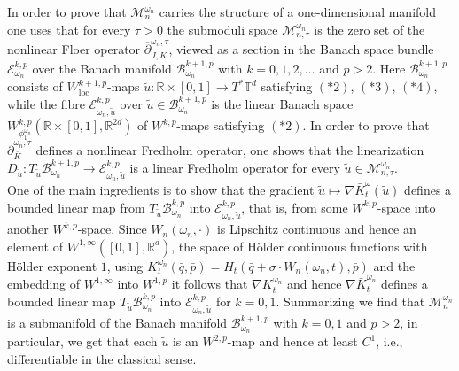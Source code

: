 \documentclass[a4paper,11pt]{amsart}
\newcommand{\RR}{\mathbb{R}}
\newcommand{\TT}{\mathbb{T}}
\begin{document}
\indent In order to prove that $\mathcal{M}^{\omega_n}_n$ carries the structure of a one-dimensional manifold one uses that for every $\tau>0$ the submoduli space $\mathcal{M}^{\omega_n}_{n,\tau}$ is the zero set of the nonlinear Floer operator $\overline{\partial}^{\omega_n,\tau}_{J,\bar{K}}$, viewed as a section in the Banach space bundle $\mathcal{E}^{k,p}_{\omega_n}$ over the Banach manifold $\mathcal{B}^{k+1,p}_{\omega_n}$ with $k=0,1,2,\ldots$ and $p>2$. Here $\mathcal{B}^{k+1,p}_{\omega_n}$ consists of $W^{k+1,p}_{\textrm{loc}}$-maps $\widetilde{u}:\RR\times [0,1]\to T^*\TT^d$ satisfying $(*2)$, $(*3)$, $(*4)$, while the fibre $\mathcal{E}^{k,p}_{\omega_n,\widetilde{u}}$ over $\widetilde{u}\in\mathcal{B}^{k+1,p}_{\omega_n}$ is the linear Banach space $W^{k,p}_{\phi^{\omega_n}_1}(\RR\times [0,1],\RR^{2d})$ of $W^{k,p}$-maps satisfying $(*2)$. In order to prove that $\overline{\partial}^{\omega_n,\tau}_{\bar{K}}$ defines a nonlinear Fredholm operator, one shows that the linearization $D_{\widetilde{u}}: T_{\widetilde{u}}\mathcal{B}^{k+1,p}_{\omega_n}\to \mathcal{E}^{k,p}_{\omega_n,\widetilde{u}}$ is a linear Fredholm operator for every $\widetilde{u}\in\mathcal{M}^{\omega_n}_{n,\tau}$. \\ \indent One of the main ingredients is to show that the gradient $\widetilde{u}\mapsto\nabla {\bar{K}}^{\omega}_t(\widetilde{u})$ defines a bounded linear map from $T_{\widetilde{u}}\mathcal{B}^{k,p}_{\omega_n}$ into $\mathcal{E}^{k,p}_{\omega_n,\widetilde{u}}$, that is, from some $W^{k,p}$-space into another $W^{k,p}$-space.  Since $W_n(\omega_n,\cdot)$ is Lipschitz continuous and hence an element of $W^{1,\infty}([0,1],\RR^d)$, the space of H\"older continuous functions with H\"older exponent $1$, using $K^{\omega_n}_t(\bar{q},\bar{p})=H_t(\bar{q}+\sigma\cdot W_n(\omega_n,t),\bar{p})$ and the embedding of $W^{1,\infty}$ into $W^{1,p}$ it follows that $\nabla K^{\omega_n}_t$ and hence $\nabla \bar{K}^{\omega_n}_t$ defines a bounded linear map $T_{\widetilde{u}}\mathcal{B}^{k,p}_{\omega_n}$ into $\mathcal{E}^{k,p}_{\omega_n,\widetilde{u}}$ for $k=0,1$. Summarizing we find that $\mathcal{M}^{\omega_n}_n$ is a submanifold of the Banach manifold $\mathcal{B}^{k+1,p}_{\omega_n}$ with $k=0,1$ and $p>2$, in particular, we get that each $\widetilde{u}$ is an $W^{2,p}$-map and hence at least $C^1$, i.e., differentiable in the classical sense. \\
\end{document}
